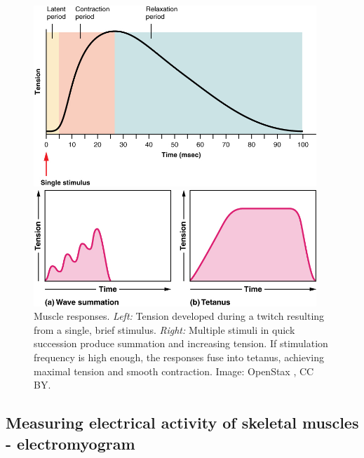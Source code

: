\documentclass[12pt]{article}
\begin{document}
\begin{figure}[h!]
\begin{minipage}{0.45\textwidth}
\centering
\includegraphics[width=0.95\textwidth]{figures/myogram.jpg}
\end{minipage}%
\begin{minipage}{0.55\textwidth}
\centering
\includegraphics[width=0.95\textwidth]{figures/summation.jpg}
\end{minipage}
\caption{Muscle responses. \textit{Left:} Tension developed during a twitch resulting from a single, brief stimulus. \textit{Right:} Multiple stimuli  in quick succession produce summation and increasing tension. If stimulation frequency is high enough, the responses fuse into tetanus, achieving maximal tension and smooth contraction. Image: OpenStax \cite{openStax2016nervous}, CC BY.}
\label{fig:twitch}
\end{figure}

\subsection*{Measuring electrical activity of skeletal muscles - electromyogram}
\end{document}
